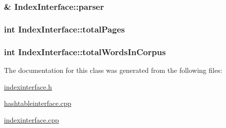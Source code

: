 \subsubsection[{parser}]{\& Index\+Interface\+::parser\hspace{0.3cm}{\ttfamily [protected]}}\label{class_index_interface_a42b0d9eccd309185ed92976f72908bb9}
\hypertarget{class_index_interface_a2df695d2b504f2e53a0bfdd6bfee31da}{}
\subsubsection[{total\+Pages}]{\setlength{\rightskip}{0pt plus 5cm}int Index\+Interface\+::total\+Pages\hspace{0.3cm}{\ttfamily [protected]}}\label{class_index_interface_a2df695d2b504f2e53a0bfdd6bfee31da}
\hypertarget{class_index_interface_ab607b430e78528cdb8bb79ba4afa91d2}{}
\subsubsection[{total\+Words\+In\+Corpus}]{\setlength{\rightskip}{0pt plus 5cm}int Index\+Interface\+::total\+Words\+In\+Corpus\hspace{0.3cm}{\ttfamily [protected]}}\label{class_index_interface_ab607b430e78528cdb8bb79ba4afa91d2}


The documentation for this class was generated from the following files\+:\begin{DoxyCompactItemize}
\item 
\hyperlink{indexinterface_8h}{indexinterface.\+h}\item 
\hyperlink{hashtableinterface_8cpp}{hashtableinterface.\+cpp}\item 
\hyperlink{indexinterface_8cpp}{indexinterface.\+cpp}\end{DoxyCompactItemize}

